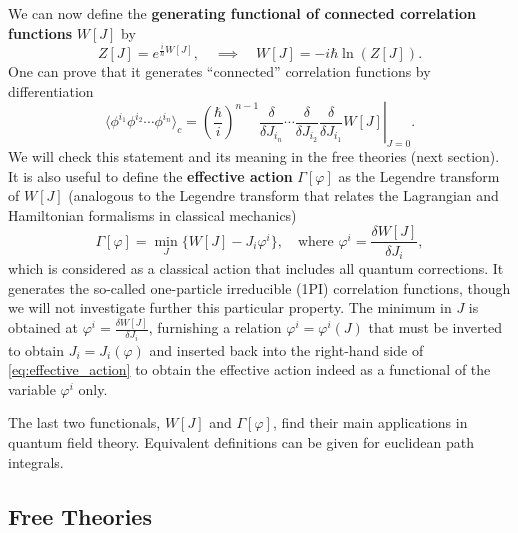 We can now define the \textbf{generating functional of connected correlation functions} \(W[J]\) by
\begin{equation}
    Z[J] = e^{\frac{i}{\hbar} W[J]}, \quad \implies \quad W[J] = - i \hbar \ln(Z[J]).
    \label{eq:generating_functional_connected}
\end{equation}
One can prove that it generates “connected” correlation functions by differentiation
\[
    \langle \phi^{i_1} \phi^{i_2} \cdots \phi^{i_n} \rangle_{c} = \left. \left(\frac{\hbar}{i}\right)^{n-1} \frac{\delta}{\delta J_{i_n}} \cdots \frac{\delta}{\delta J_{i_2}} \frac{\delta}{\delta J_{i_1}} W[J] \right|_{J=0}.
\]
We will check this statement and its meaning in the free theories (next section). It is also useful to define the \textbf{effective action} \(\Gamma[\varphi]\) as the Legendre transform of \(W[J]\) (analogous to the Legendre transform that relates the Lagrangian and Hamiltonian formalisms in classical mechanics)
\begin{equation}
    \Gamma[\varphi] = \min_{J} \{W[J] - J_i \varphi^i\}, \quad \text{where } \varphi^i = \frac{\delta W[J]}{\delta J_i},
    \label{eq:effective_action}
\end{equation}
which is considered as a classical action that includes all quantum corrections. It generates the so-called one-particle irreducible (1PI) correlation functions, though we will not investigate further this particular property. The minimum in \(J\) is obtained at \(\varphi^i = \frac{\delta W[J]}{\delta J_i}\), furnishing a relation \(\varphi^i = \varphi^i(J)\) that must be inverted to obtain \(J_i = J_i(\varphi)\) and inserted back into the right-hand side of \eqref{eq:effective_action} to obtain the effective action indeed as a functional of the variable \(\varphi^i\) only.

The last two functionals, \(W [J]\) and \(\Gamma[\varphi]\), find their main applications in quantum field theory. Equivalent definitions can be given for euclidean path integrals.

\subsection{Free Theories}

